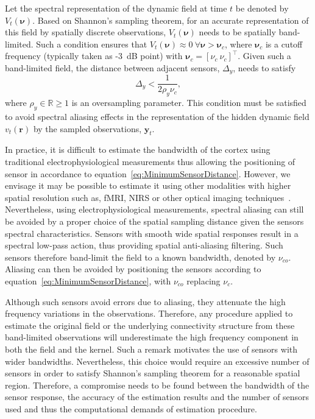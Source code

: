 \documentclass[twocolumn,11pt,a4paper]{article}		%
\begin{document}
Let the spectral representation of the dynamic field at time $t$ be denoted by $V_t(\boldsymbol{\nu})$. Based on Shannon's sampling theorem, for an accurate representation of this field by spatially discrete observations, $V_t(\boldsymbol{\nu})$ needs to be spatially band-limited. Such a condition ensures that $V_t(\boldsymbol{\nu}) \approx 0 ~ \forall \boldsymbol{\nu} > \boldsymbol{\nu}_c$, where $\boldsymbol{\nu}_c$ is a cutoff frequency (typically taken as -3~dB point) with $\boldsymbol{\nu}_c = [\nu_c ~ \nu_c]^\top$. Given such a band-limited field, the distance between adjacent sensors, $\Delta_y$, needs to satisfy 
\begin{equation}
	\label{eq:MinimumSensorDistance} \Delta_y < \frac{1}{2\rho_y\nu_{c}}, 
\end{equation}
where $\rho_y \in \mathbb{R} \ge 1$ is an oversampling parameter. This condition must be satisfied to avoid spectral aliasing effects in the representation of the hidden dynamic field $v_t(\mathbf{r})$ by the sampled observations, $\mathbf{y}_t$.

In practice, it is difficult to estimate the bandwidth of the cortex using traditional electrophysiological measurements thus allowing the positioning of sensor in accordance to equation~\ref{eq:MinimumSensorDistance}. However, we envisage it may be possible to estimate it using other modalities with higher spatial resolution such as, fMRI, NIRS or other optical imaging techniques~\cite{Issa2000}. Nevertheless, using electrophysiological measurements, spectral aliasing can still be avoided by a proper choice of the spatial sampling distance given the sensors spectral characteristics. Sensors with smooth wide spatial responses result in a spectral low-pass action, thus providing spatial anti-aliasing filtering. Such sensors therefore band-limit the field to a known bandwidth, denoted by $\nu_{co}$. Aliasing can then be avoided by positioning the sensors according to equation~\ref{eq:MinimumSensorDistance}, with $\nu_{co}$ replacing $\nu_c$. 

Although such sensors avoid errors due to aliasing, they attenuate the high frequency variations in the observations. Therefore, any procedure applied to estimate the original field or the underlying connectivity structure from these band-limited observations will underestimate the high frequency component in both the field and the kernel. Such a remark motivates the use of sensors with wider bandwidths. Nevertheless, this choice would require an excessive number of sensors in order to satisfy Shannon's sampling theorem for a reasonable spatial region. Therefore, a compromise needs to be found between the bandwidth of the sensor response, the accuracy of the estimation results and the number of sensors used and thus the computational demands of estimation procedure.
\end{document}
